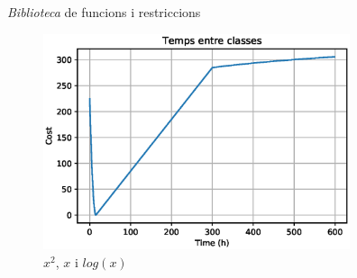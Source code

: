\documentclass[twocolumn]{beamer}
\begin{document}
\begin{frame}{\textit{Biblioteca} de funcions i restriccions}
\begin{figure}
	\includegraphics[width=9cm]{interclass}
	\caption{$x^2$, $x$ i $log(x)$}
\end{figure}
\end{frame}
\end{document}
